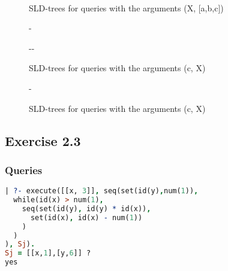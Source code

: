 \begin{figure}[H]
  \centering
  \subfloat[{middle1(X, [a,b,c])}]{\label{m1xabc}}\hspace{0.5cm} 
  \subfloat[{middle2(X, [a,b,c])}]{\label{m2xabc}}\\
  \subfloat[{middle3(X, [a,b,c])}]{\label{m3xabc}}\hspace{0.2cm}
  \subfloat[{middle4(X, [a,b,c])}]{\label{m4xabc}}
  \caption{SLD-trees for queries with the arguments (X, [a,b,c])}
  \label{xabc}
\end{figure}

\begin{figure}[H]
  \begin{adjustwidth}{\oddsidemargin-0.8in}{-\rightmargin}    
  \subfloat[{middle1(c, X)}]{\label{m1xabc}}\\
  \end{adjustwidth}
  \begin{adjustwidth}{-\oddsidemargin-0.15in}{-\rightmargin}        
  \vspace{1cm}\subfloat[{middle2(c, X)}]{\label{m2xabc}}\\
  \end{adjustwidth}
  \caption{SLD-trees for queries with the arguments (c, X)}
  \label{cx1}
\end{figure}

\begin{figure}[H]
  \begin{adjustwidth}{\oddsidemargin-1.5in}{-\rightmargin}
  \subfloat[{middle3(c, X)}]{\label{m3xabc}}
  \subfloat[{middle4(c, X)}]{\label{m4xabc}}
  \end{adjustwidth}
  \caption{SLD-trees for queries with the arguments (c, X)}
  \label{cx2}
\end{figure}

\pagebreak

\subsection{Exercise 2.3}

\subsubsection{Queries}
\begin{lstlisting}[language=Prolog]
| ?- execute([[x, 3]], seq(set(id(y),num(1)),
  while(id(x) > num(1),
    seq(set(id(y), id(y) * id(x)),
      set(id(x), id(x) - num(1))
    )
  )
), Sj).
Sj = [[x,1],[y,6]] ?
yes
\end{lstlisting}

